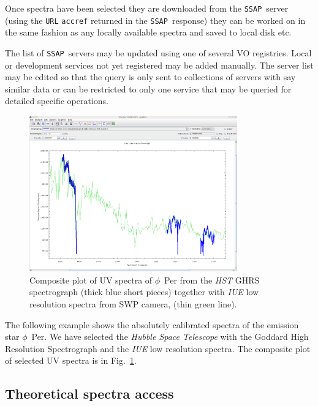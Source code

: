 \documentclass[final,authoryear,5p,times,twocolumn]{elsarticle}
\newcommand{\ssap}{\texttt{SSAP}}
\begin{document}
Once spectra have been selected they are downloaded from the \ssap\ server
(using the \texttt{URL} \texttt{accref} returned in the \ssap\ response) they
can be worked on in the same fashion as any locally available spectra and saved
to local disk etc.

The list of \ssap\ servers may be updated using one of several VO registries.
Local or development services not yet registered may be added manually. The
server list may be edited so that the query is only sent to collections of
servers with say similar data or can be restricted to only one service that may
be queried for detailed specific operations.

\begin{figure}[th]
\begin{center}
\includegraphics[width=0.8\textwidth]{iuehst2.pdf}
\caption{Composite plot of UV spectra of $\phi$~Per from the \emph{HST} GHRS
spectrograph (thick blue short pieces) together with \emph{IUE} low resolution
spectra from SWP camera, (thin green line).}
\label{fig:iuehst2}
\end{center}
\end{figure}

The following example shows the absolutely calibrated spectra of the emission
star $\phi$~Per. We have selected the \emph{Hubble Space Telescope} with the
Goddard High Resolution Spectrograph and the \emph{IUE} low resolution spectra.
The composite plot of selected  UV spectra is in Fig.~\ref{fig:iuehst2}.

\subsection{ Theoretical spectra access}
\end{document}
